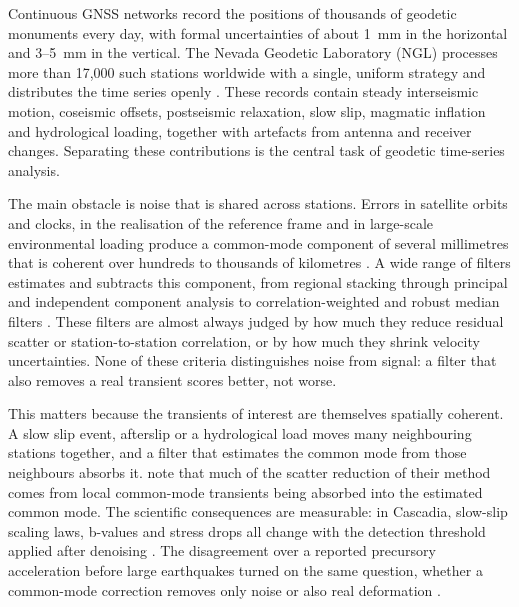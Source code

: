 \documentclass[11pt,a4paper]{article}
\begin{document}
Continuous GNSS networks record the positions of thousands of geodetic monuments every day, with formal uncertainties of about 1~mm in the horizontal and 3--5~mm in the vertical. The Nevada Geodetic Laboratory (NGL) processes more than 17,000 such stations worldwide with a single, uniform strategy and distributes the time series openly \citep{blewitt2018,ngl2026}. These records contain steady interseismic motion, coseismic offsets, postseismic relaxation, slow slip, magmatic inflation and hydrological loading, together with artefacts from antenna and receiver changes. Separating these contributions is the central task of geodetic time-series analysis.

The main obstacle is noise that is shared across stations. Errors in satellite orbits and clocks, in the realisation of the reference frame and in large-scale environmental loading produce a common-mode component of several millimetres that is coherent over hundreds to thousands of kilometres \citep{wdowinski1997,dong2006,kreemer2021}. A wide range of filters estimates and subtracts this component, from regional stacking \citep{wdowinski1997} through principal and independent component analysis \citep{dong2006,shen2014,gruszczynski2018,zhou2022,liu2026} to correlation-weighted and robust median filters \citep{tianshen2016,kreemer2021}. These filters are almost always judged by how much they reduce residual scatter or station-to-station correlation, or by how much they shrink velocity uncertainties. None of these criteria distinguishes noise from signal: a filter that also removes a real transient scores better, not worse.

This matters because the transients of interest are themselves spatially coherent. A slow slip event, afterslip or a hydrological load moves many neighbouring stations together, and a filter that estimates the common mode from those neighbours absorbs it. \citet{kreemer2021} note that much of the scatter reduction of their method comes from local common-mode transients being absorbed into the estimated common mode. The scientific consequences are measurable: in Cascadia, slow-slip scaling laws, b-values and stress drops all change with the detection threshold applied after denoising \citep{costantino2026}. The disagreement over a reported precursory acceleration before large earthquakes \citep{bletery2023} turned on the same question, whether a common-mode correction removes only noise or also real deformation \citep{bradley2023,bletery2025}.
\end{document}
